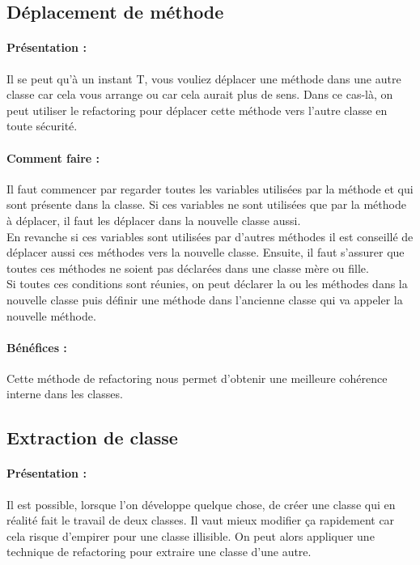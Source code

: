 \documentclass[a4paper,twoside,12pt,openright]{report}
\begin{document}
\subsection{Déplacement de méthode}
\paragraph{Présentation :}
Il se peut qu'à un instant T, vous vouliez déplacer une méthode dans une autre classe car cela vous arrange ou car cela aurait plus de sens. Dans ce cas-là, on peut utiliser le refactoring pour déplacer cette méthode vers l'autre classe en toute sécurité.

\paragraph{Comment faire :}
Il faut commencer par regarder toutes les variables utilisées par la méthode et qui sont présente dans la classe. Si ces variables ne sont utilisées que par la méthode à déplacer, il faut les déplacer dans la nouvelle classe aussi.\\
En revanche si ces variables sont utilisées par d'autres méthodes il est conseillé de déplacer aussi ces méthodes vers la nouvelle classe.
Ensuite, il faut s'assurer que toutes ces méthodes ne soient pas déclarées dans une classe mère ou fille.\\
Si toutes ces conditions sont réunies, on peut déclarer la ou les méthodes dans la nouvelle classe puis définir une méthode dans l'ancienne classe qui va appeler la nouvelle méthode.

\paragraph{Bénéfices :}
Cette méthode de refactoring nous permet d'obtenir une meilleure cohérence interne dans les classes.\\

\newpage

\subsection{Extraction de classe}
\paragraph{Présentation :}
Il est possible, lorsque l'on développe quelque chose, de créer une classe qui en réalité fait le travail de deux classes. Il vaut mieux modifier ça rapidement car cela risque d'empirer pour une classe illisible. On peut alors appliquer une technique de refactoring pour extraire une classe d'une autre.
\end{document}
